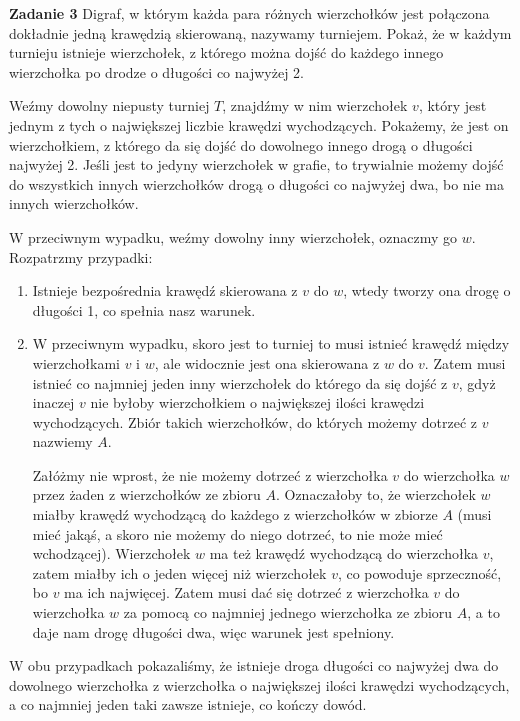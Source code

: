 \documentclass[12pt,a4paper]{article}
\begin{document}
\newpage

\noindent
\textbf{Zadanie 3} Digraf, w którym każda para różnych wierzchołków jest połączona dokładnie jedną
krawędzią skierowaną, nazywamy turniejem. Pokaż, że w każdym turnieju istnieje wierzchołek, z którego można dojść do każdego innego wierzchołka po drodze o długości co najwyżej 2.
\vskip 0.2cm

Weźmy dowolny niepusty turniej \(T\), znajdźmy w nim wierzchołek \(v\), który jest jednym z tych o największej liczbie krawędzi wychodzących. Pokażemy, że jest on wierzchołkiem, z którego da się dojść do dowolnego innego drogą o długości najwyżej 2. Jeśli jest to jedyny wierzchołek w grafie, to trywialnie możemy dojść do wszystkich innych wierzchołków drogą o długości co najwyżej dwa, bo nie ma innych wierzchołków.

W przeciwnym wypadku, weźmy dowolny inny wierzchołek, oznaczmy go \(w\). Rozpatrzmy przypadki:
\begin{enumerate}
	\item Istnieje bezpośrednia krawędź skierowana z \(v\) do \(w\), wtedy tworzy ona drogę o
	długości 1, co spełnia nasz warunek.
	\item W przeciwnym wypadku, skoro jest to turniej to musi istnieć krawędź między wierzchołkami
	\(v\) i \(w\), ale widocznie jest ona skierowana z \(w\) do \(v\). Zatem musi istnieć co
	najmniej jeden inny wierzchołek do którego da się dojść z \(v\), gdyż inaczej \(v\) nie 
	byłoby wierzchołkiem o największej ilości krawędzi wychodzących. Zbiór takich wierzchołków,
	do których możemy dotrzeć z \(v\) nazwiemy \(A\). 
	
	Załóżmy nie wprost, że nie możemy dotrzeć z wierzchołka \(v\) do wierzchołka \(w\) przez
	żaden z wierzchołków ze zbioru \(A\). Oznaczałoby to, że wierzchołek \(w\) miałby krawędź
	wychodzącą do każdego z wierzchołków w zbiorze \(A\) (musi mieć jakąś, a skoro nie możemy
	do niego dotrzeć, to nie może mieć wchodzącej). Wierzchołek \(w\) ma też krawędź wychodzącą
	do wierzchołka \(v\), zatem miałby ich o jeden więcej niż wierzchołek \(v\), co powoduje
	sprzeczność, bo \(v\) ma ich najwięcej. Zatem musi dać się dotrzeć z wierzchołka \(v\) do
	wierzchołka \(w\) za pomocą co najmniej jednego wierzchołka ze zbioru \(A\), a to
	daje nam drogę długości dwa, więc warunek jest spełniony.
\end{enumerate}

W obu przypadkach pokazaliśmy, że istnieje droga długości co najwyżej dwa do dowolnego wierzchołka z wierzchołka o największej ilości krawędzi wychodzących, a co najmniej jeden taki zawsze istnieje,  co kończy dowód.
\end{document}

